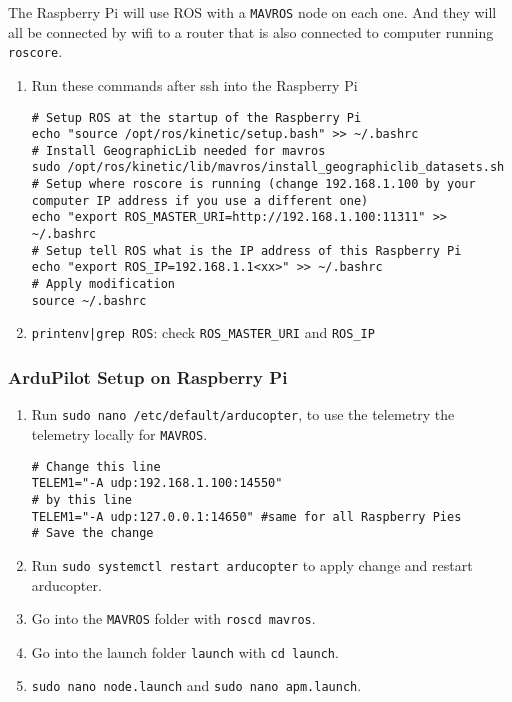 The Raspberry Pi will use ROS with a \texttt{MAVROS} node on each one. And they will all be connected by wifi to a router that is also connected to computer running \texttt{roscore}.
\begin{enumerate}
    \item Run these commands after ssh into the Raspberry Pi

          \begin{verbatim}
# Setup ROS at the startup of the Raspberry Pi
echo "source /opt/ros/kinetic/setup.bash" >> ~/.bashrc
# Install GeographicLib needed for mavros
sudo /opt/ros/kinetic/lib/mavros/install_geographiclib_datasets.sh
# Setup where roscore is running (change 192.168.1.100 by your computer IP address if you use a different one)
echo "export ROS_MASTER_URI=http://192.168.1.100:11311" >> ~/.bashrc
# Setup tell ROS what is the IP address of this Raspberry Pi
echo "export ROS_IP=192.168.1.1<xx>" >> ~/.bashrc
# Apply modification
source ~/.bashrc
                    \end{verbatim}
    \item \texttt{printenv|grep ROS}: check \texttt{ROS\_MASTER\_URI} and \texttt{ROS\_IP}
\end{enumerate}

\subsubsection{ArduPilot Setup on Raspberry Pi}
\begin{enumerate}
    \item Run \texttt{sudo nano /etc/default/arducopter}, to use the telemetry the telemetry locally for \texttt{MAVROS}.

          \begin{verbatim}
# Change this line
TELEM1="-A udp:192.168.1.100:14550"
# by this line
TELEM1="-A udp:127.0.0.1:14650" #same for all Raspberry Pies
# Save the change
          \end{verbatim}

    \item Run \texttt{sudo systemctl restart arducopter} to apply change and restart arducopter.
    \item Go into the \texttt{MAVROS} folder with \texttt{roscd mavros}.
    \item Go into the launch folder \texttt{launch} with \texttt{cd launch}.
    \item \texttt{sudo nano node.launch} and \texttt{sudo nano apm.launch}.
\end{enumerate}

